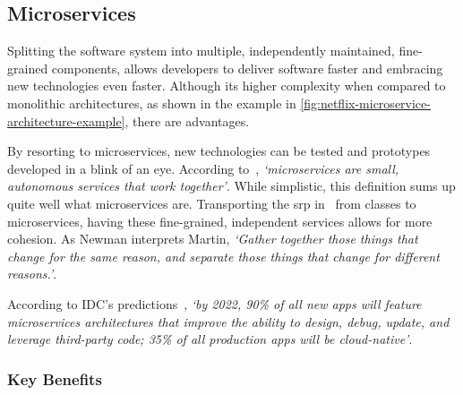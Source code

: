 


\subsection{Microservices}\label{state-of-the-art:ss:microservices}


Splitting the software system into multiple, independently maintained, fine-grained components, allows developers to deliver software faster and embracing new technologies even faster. Although its higher complexity when compared to monolithic architectures, as shown in the example in \cref{fig:netflix-microservice-architecture-example}, there are advantages.



By resorting to microservices, new technologies can be tested and prototypes developed in a blink of an eye.
According to~\Parencite{newman_2015}, \textit{`microservices are small, autonomous services that work together'}. While simplistic, this definition sums up quite well what microservices are. Transporting the \gls{srp} in~\Parencite{martin_2014} from classes to microservices, having these fine-grained, independent services allows for more cohesion. As Newman interprets Martin, \textit{`Gather together those things that change for the
same reason, and separate those things that change for different reasons.'}.




According to IDC's predictions~\Parencite{idc_2019}, \textit{`by 2022, 90\% of all new apps will feature microservices architectures that improve the ability to design, debug, update, and leverage third-party code; 35\% of all production apps will be cloud-native'}.



\subsubsection*{Key Benefits}\label{state-of-the-art:sss:key-benefits}

